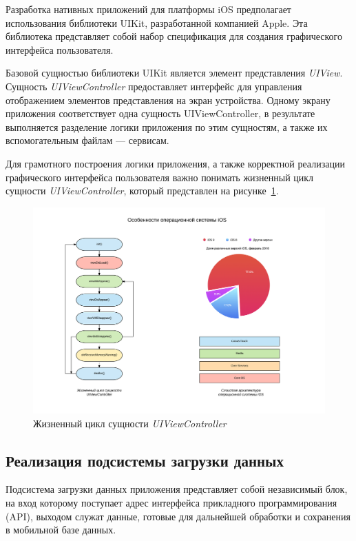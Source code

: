 Разработка нативных приложений для платформы iOS предполагает использования
библиотеки UIKit, разработанной компанией Apple. Эта библиотека представляет
собой набор спецификация для создания графического интерфейса пользователя.

\pagebreak

Базовой сущностью библиотеки UIKit является элемент представления \textit{UIView}.
Сущность \textit{UIViewController} предоставляет интерфейс для управления отображением
элементов представления на экран устройства. Одному экрану приложения соответствует
одна сущность UIViewController, в результате выполняется разделение
логики приложения по этим сущностям, а также их вспомогательным файлам --- сервисам.

Для грамотного построения логики приложения, а также корректной реализации графического
интерфейса пользователя важно понимать жизненный цикл сущности \textit{UIViewController},
который представлен на рисунке~\ref{fig:vc_lifecycle}.
\begin{figure}[h!]
  \centering
  \includegraphics[width=120mm]{fig/vc_lifecycle}
  \caption{Жизненный цикл сущности \textit{UIViewController}}
  \label{fig:vc_lifecycle}
\end{figure}

\newpage



\subsection{Реализация подсистемы загрузки данных}
\label{subs:realization_network_requests}

Подсистема загрузки данных приложения представляет собой независимый блок,
на вход которому поступает адрес интерфейса прикладного программирования (API),
выходом служат данные, готовые для дальнейшей обработки и сохранения
в мобильной базе данных.

